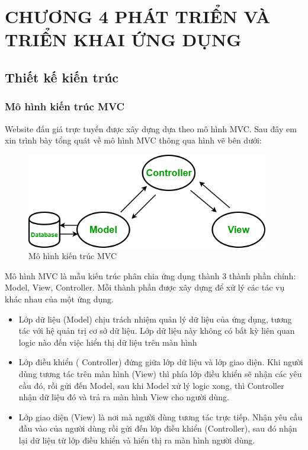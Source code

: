 \documentclass{article}
\begin{document}
\section*{CHƯƠNG 4 PHÁT TRIỂN VÀ TRIỂN KHAI ỨNG DỤNG}
\setcounter{section}{4}
\setcounter{subsection}{0}
\setcounter{figure}{0}
\setcounter{table}{0}
\subsection{Thiết kế kiến trúc}
\subsubsection{Mô hình kiến trúc MVC}
Website đấu giá trực tuyến được xây dựng dựa theo mô hình MVC. Sau đây em xin trình bày tổng quát về mô hình MVC thông qua hình vẽ bên dưới: 
\begin{figure}[H]
    \centering
    \includegraphics[width=10.6cm,height=4.15cm]{images/mvc.png}
    \caption{Mô hình kiến trúc MVC}
    \label{hinh41}
\end{figure}
Mô hình MVC là mẫu kiến trúc phân chia ứng dụng thành 3 thành phần chính: Model, View, Controller. Mỗi thành phần được xây dựng để xử lý các tác vụ khác nhau của một ứng dụng.
\begin{itemize}
    \item Lớp dữ liệu (Model) chịu trách nhiệm quản lý dữ liệu của ứng dụng, tương tác với hệ quản trị cơ sở dữ liệu. Lớp dữ liệu này không có bất kỳ liên quan logic nào đến việc hiển thị dữ liệu trên màn hình
    \item Lớp điều khiển ( Controller) đứng giữa lớp dữ liệu và lớp giao diện. Khi người dùng tương tác trên màn hình (View) thì phía lớp điều khiển sẽ nhận các yêu cầu đó, rồi gửi đến Model, sau khi Model xử lý logic xong, thì Controller nhận dữ liệu đó và trả ra màn hình View cho người dùng.
    \item Lớp giao diện (View) là nơi mà người dùng tương tác trực tiếp. Nhận yêu cầu đầu vào của người dùng rồi gửi đến lớp điều khiển (Controller), sau đó nhận lại dữ liệu từ lớp điều khiển và hiển thị ra màn hình người dùng.
\end{itemize}
\end{document}
